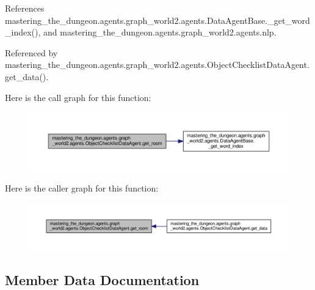 References mastering\+\_\+the\+\_\+dungeon.\+agents.\+graph\+\_\+world2.\+agents.\+Data\+Agent\+Base.\+\_\+get\+\_\+word\+\_\+index(), and mastering\+\_\+the\+\_\+dungeon.\+agents.\+graph\+\_\+world2.\+agents.\+nlp.



Referenced by mastering\+\_\+the\+\_\+dungeon.\+agents.\+graph\+\_\+world2.\+agents.\+Object\+Checklist\+Data\+Agent.\+get\+\_\+data().

Here is the call graph for this function\+:
\nopagebreak
\begin{figure}[H]
\begin{center}
\leavevmode
\includegraphics[width=350pt]{classmastering__the__dungeon_1_1agents_1_1graph__world2_1_1agents_1_1ObjectChecklistDataAgent_a447df3fe38f1b40e63eb63a79210e1cb_cgraph}
\end{center}
\end{figure}
Here is the caller graph for this function\+:
\nopagebreak
\begin{figure}[H]
\begin{center}
\leavevmode
\includegraphics[width=350pt]{classmastering__the__dungeon_1_1agents_1_1graph__world2_1_1agents_1_1ObjectChecklistDataAgent_a447df3fe38f1b40e63eb63a79210e1cb_icgraph}
\end{center}
\end{figure}


\subsection{Member Data Documentation}
\mbox{\label{classmastering__the__dungeon_1_1agents_1_1graph__world2_1_1agents_1_1ObjectChecklistDataAgent_a45ff71286876401d4dff6aa5b225f06d}} 

